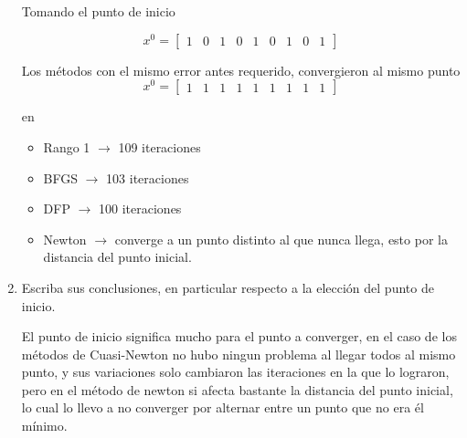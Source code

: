 \documentclass[12pt]{article}
\begin{document}
\begin{enumerate}
    Tomando el punto de inicio 

    \[x^0 = \begin{bmatrix}
        1 & 0 &  1&  0 &1 &0& 1& 0& 1
    \end{bmatrix}\]

    Los métodos con el mismo error antes requerido, convergieron al mismo punto
    \[x^0 = \begin{bmatrix}
        1 & 1 &  1&  1 &1 &1& 1& 1& 1
    \end{bmatrix}\]

    en

    \begin{itemize}
        \item Rango 1 $\rightarrow$ 109 iteraciones
        \item BFGS $\rightarrow$ 103 iteraciones
        \item DFP $\rightarrow$ 100 iteraciones
        \item Newton $\rightarrow$ converge a un punto distinto al que nunca llega, esto por la distancia del punto inicial.
    \end{itemize}
    \item Escriba sus conclusiones, en particular respecto a la elección del punto de inicio.
    
    El punto de inicio significa mucho para el punto a converger, en el caso de los métodos de Cuasi-Newton no hubo ningun problema al llegar todos al mismo punto, y sus variaciones solo cambiaron las iteraciones en la que lo lograron, pero en el método de newton si afecta bastante la distancia del punto inicial, lo cual lo llevo a no converger por alternar entre un punto que no era él mínimo.
\end{enumerate}


\end{document}
